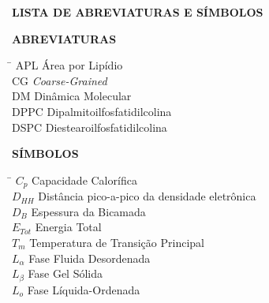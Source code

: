 \newpage
\begin{center}
{\fontsize{17}{20.4}\selectfont \textbf{LISTA DE ABREVIATURAS E SÍMBOLOS}}
\end{center}
\vspace{18pt}

{\fontsize{12}{14.4}\selectfont \textbf{ABREVIATURAS}} \\
\vspace{6pt}
\begin{tabbing}
\hspace{2cm} \= \kill
APL \> Área por Lipídio \\
CG \> \textit{Coarse-Grained} \\
DM \> Dinâmica Molecular \\
DPPC \> Dipalmitoilfosfatidilcolina \\
DSPC \> Diestearoilfosfatidilcolina \\
\end{tabbing}

\vspace{12pt}
{\fontsize{12}{14.4}\selectfont \textbf{SÍMBOLOS}} \\
\vspace{6pt}
\begin{tabbing}
\hspace{2cm} \= \kill
$C_p$ \> Capacidade Calorífica \\
$D_{HH}$ \> Distância pico-a-pico da densidade eletrônica \\
$D_B$ \> Espessura da Bicamada \\
$E_{Tot}$ \> Energia Total \\
$T_m$ \> Temperatura de Transição Principal \\
$L_\alpha$ \> Fase Fluida Desordenada \\
$L_\beta$ \> Fase Gel Sólida \\
$L_o$ \> Fase Líquida-Ordenada
\end{tabbing}
\newpage
